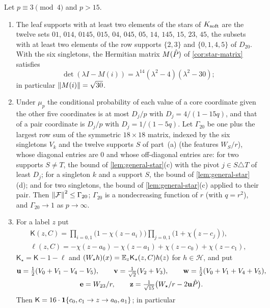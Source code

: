 \begin{lemma}\label{lem:l20-star-matrix}
Let $p\equiv3\pmod4$ and $p>15$.
\begin{enumerate}[label=\textup{(\alph*)}]
\item The leaf supports with at least two elements of the stars of
 $K_{\rm soft}$ are the twelve sets $01$, $014$, $0145$, $015$, $04$, $045$,
 $05$, $14$, $145$, $15$, $23$, $45$, the subsets with at least two elements of
 the row supports $\{2,3\}$ and $\{0,1,4,5\}$ of $D_{20}$. With the six
 singletons, the Hermitian matrix $M(\hat P)$ of \cref{cor:star-matrix}
 satisfies
 \[
  \det(\lambda I-M(i))=\lambda^{14}(\lambda^2-4)(\lambda^2-30);
 \]
 in particular $\left\|M(i)\right\|=\sqrt{30}$.
\item Under $\mu_p$ the conditional probability of each value of a core
 coordinate given the other five coordinates is at most $D_j/p$ with
 $D_j=4/(1-15q)$, and that of a pair coordinate is $D_j/p$ with
 $D_j=1/(1-5q)$. Let $\Gamma_{20}$ be one plus the largest row
 sum of the symmetric $18\times18$ matrix, indexed by the six
 singletons $V_k$ and the twelve supports $S$ of part~(a) (the
 features $W_S/r$), whose diagonal entries are $0$ and whose
 off-diagonal entries are: for two supports $S\ne T$, the bound of
 \cref{lem:general-star}(c) with the pivot $j\in S\triangle T$ of
 least $D_j$; for a singleton $k$ and a support $S$, the bound of
 \cref{lem:general-star}(d); and for two singletons, the bound of
 \cref{lem:general-star}(c) applied to their pair.
 Then $\left\|\mathcal F\right\|^2\le\Gamma_{20}$; $\Gamma_{20}$ is a nondecreasing
 function of $r$ (with $q=r^2$), and $\Gamma_{20}\to1$ as $p\to\infty$.
\item For a label $z$ put
 \begin{gather*}
  \mathsf K(z,C)=\prod_{i=0,1}\bigl(1-\chi(z-a_i)\bigr)
  \prod_{j=0,1}\bigl(1+\chi(z-c_j)\bigr),\\
  \ell(z,C)=-\chi(z-a_0)-\chi(z-a_1)+\chi(z-c_0)+\chi(z-c_1),
 \end{gather*}
 $\mathsf K_\star=\mathsf K-1-\ell$ and $(W_\star h)(x)=\mathbb E_z\mathsf K_\star(z,C)h(z)$
 for $h\in\mathcal H$, and put
 \begin{gather*}
  \mathbf u=\tfrac12(V_0+V_1-V_4-V_5),\qquad
  \mathbf v=\tfrac1{\sqrt2}(V_2+V_3),\qquad
  \mathbf w=\tfrac12(V_0+V_1+V_4+V_5),\\
  \mathbf e=W_{23}/r,\qquad
  \mathbf z=\tfrac1{\sqrt{15}}\bigl(W_\star/r-2\mathbf u\hat P\bigr).
 \end{gather*}
 Then $\mathsf K=16\cdot\mathbf 1\{c_0,c_1\to z\to a_0,a_1\}$; in particular

\end{enumerate}
\end{lemma}
